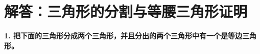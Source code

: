 \newpage





\newpage

\section{解答：三角形的分割与等腰三角形证明}

\vspace{0.4cm}

\noindent\textbf{1. 把下面的三角形分成两个三角形，并且分出的两个三角形中有一个是等边三角形。}

\vspace{0.6cm}

